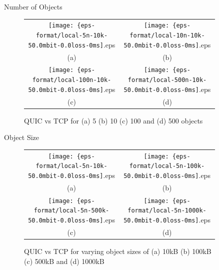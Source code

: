 \documentclass[final]{beamer}
\newlength{\sepwid}
\newlength{\onecolwid}
\begin{document}
\begin{frame}[t]
\begin{columns}[t]
\begin{column}{\onecolwid}
\begin{block}{Number of Objects}
\begin{figure}
\begin{tabular}{c c}
\texttt{[image: \{eps-format/local-5n-10k-50.0mbit-0.0loss-0ms]}.eps} &
\texttt{[image: \{eps-format/local-10n-10k-50.0mbit-0.0loss-0ms]}.eps} \\
\tiny (a) & \tiny (b) \\
\texttt{[image: \{eps-format/local-100n-10k-50.0mbit-0.0loss-0ms]}.eps} &
\texttt{[image: \{eps-format/local-500n-10k-50.0mbit-0.0loss-0ms]}.eps} \\
\tiny (c) & \tiny (d) \\
\end{tabular}
\caption{QUIC vs TCP for (a) 5 (b) 10 (c) 100 and (d) 500 objects}
\end{figure}
\end{block}

\begin{block}{Object Size}
\begin{figure}
\begin{tabular}{c c}
\texttt{[image: \{eps-format/local-5n-10k-50.0mbit-0.0loss-0ms]}.eps} &
\texttt{[image: \{eps-format/local-5n-100k-50.0mbit-0.0loss-0ms]}.eps} \\
\tiny (a) & \tiny (b) \\
\texttt{[image: \{eps-format/local-5n-500k-50.0mbit-0.0loss-0ms]}.eps} &
\texttt{[image: \{eps-format/local-5n-1000k-50.0mbit-0.0loss-0ms]}.eps} \\
\tiny (c) & \tiny (d) \\
\end{tabular}
\caption{QUIC vs TCP for varying object sizes of (a) 10kB (b) 100kB (c) 500kB and (d) 1000kB}
\end{figure}
\end{block}
\end{column} %

\begin{column}{\sepwid}\end{column} %

\begin{column}{\onecolwid} %



\end{column}
\end{columns}
\end{frame}
\end{document}
